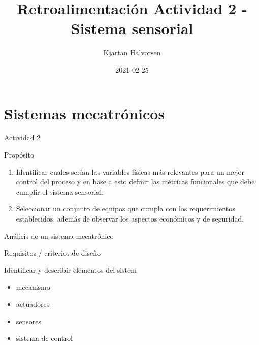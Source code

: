 \documentclass[presentation,aspectratio=169]{beamer}
\author{Kjartan Halvorsen}
\date{2021-02-25}
\title{Retroalimentación Actividad 2 - Sistema sensorial}
\begin{document}
\maketitle

\section{Sistemas mecatrónicos}
\label{sec:orgf9bc056}

\begin{frame}[label={sec:org1c8b699}]{Actividad 2}
\begin{block}{Propósito}
\begin{enumerate}
\item Identificar cuales serían \alert{las variables físicas más relevantes para un mejor control} del proceso y en base a esto \alert{definir las métricas funcionales} que debe cumplir el sistema sensorial.

\item Seleccionar un conjunto de \alert{equipos que cumpla con los requerimientos establecidos}, además de observar los aspectos económicos y de seguridad.
\end{enumerate}
\end{block}
\end{frame}

\begin{frame}[label={sec:orgc50fc9f}]{Análisis de un sistema mecatrónico}
\begin{block}{Requisitos / criterios de diseño}
\end{block}

\begin{block}{Identificar y describir elementos del sistem}
\begin{itemize}
\item mecanismo
\item actuadores
\item sensores
\item sistema de control
\end{itemize}
\end{block}
\end{frame}
\end{document}
